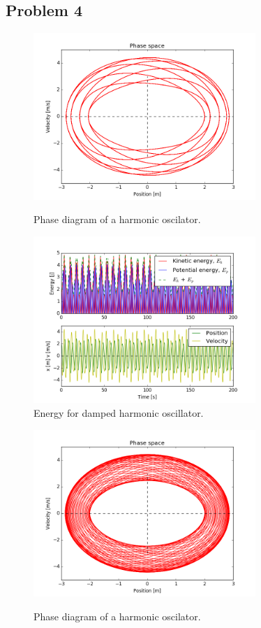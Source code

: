 \documentclass{article}
\begin{document}
\subsection*{Problem 4}
\begin{figure}[H]
\centering
\includegraphics[width=0.75\textwidth]{problem_4_1_1}\label{figure_1}
\caption{Phase diagram of a harmonic oscilator.}
\label{fig:problem_b_contour_fig}
\end{figure}
\begin{figure}[H]
\centering
\includegraphics[width=0.75\textwidth]{problem_4_1_2}
\caption{Energy for damped harmonic oscillator.}
\label{fig:problem_b_contour_fig}
\end{figure}
\begin{figure}[H]
\centering
\includegraphics[width=0.75\textwidth]{problem_4_2_1}\label{figure_1}
\caption{Phase diagram of a harmonic oscilator.}
\label{fig:problem_b_contour_fig}
\end{figure}
\end{document}
